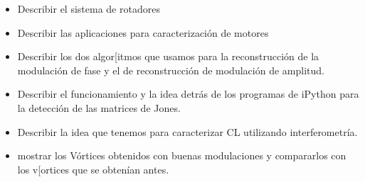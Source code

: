 \begin{itemize}
\item Describir el sistema de rotadores
\item Describir las aplicaciones para caracterización de motores
\item Describir los dos algor[itmos que usamos para la reconstrucción
  de la modulación de fase y el de reconstrucción de modulación de
  amplitud. 
\item Describir el funcionamiento y la idea detrás de los programas de
  iPython para la detección de las matrices de Jones.
\item Describir la idea que tenemos para caracterizar CL utilizando
  interferometría.
\item mostrar los Vórtices obtenidos con buenas modulaciones y
  compararlos con los v[ortices que se obtenían antes.
\end{itemize}


\newpage
\pagebreak[4]
